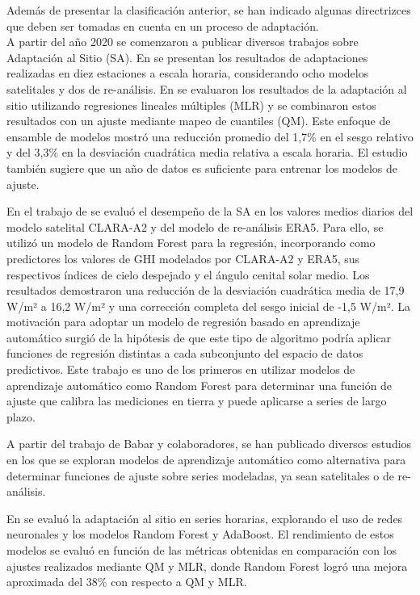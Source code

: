Además de presentar la clasificación anterior, se han indicado algunas directrizces que deben ser tomadas en cuenta en un proceso de adaptación. \\



A partir del año 2020 se comenzaron a publicar diversos trabajos sobre Adaptación al Sitio (SA). En \citep{POLO2020} se presentan los resultados de adaptaciones realizadas en diez estaciones a escala horaria, considerando ocho modelos satelitales y dos de re-análisis. En \citep{Fernández2020} se evaluaron los resultados de la adaptación al sitio utilizando regresiones lineales múltiples (MLR) y se combinaron estos resultados con un ajuste mediante mapeo de cuantiles (QM). Este enfoque de ensamble de modelos mostró una reducción promedio del 1,7\% en el sesgo relativo y del 3,3\% en la desviación cuadrática media relativa a escala horaria. El estudio también sugiere que un año de datos es suficiente para entrenar los modelos de ajuste.

En el trabajo de \citep{BABAR2020} se evaluó el desempeño de la SA en los valores medios diarios del modelo satelital CLARA-A2 y del modelo de re-análisis ERA5. Para ello, se utilizó un modelo de Random Forest para la regresión, incorporando como predictores los valores de GHI modelados por CLARA-A2 y ERA5, sus respectivos índices de cielo despejado y el ángulo cenital solar medio. Los resultados demostraron una reducción de la desviación cuadrática media de 17,9 W/m² a 16,2 W/m² y una corrección completa del sesgo inicial de -1,5 W/m². La motivación para adoptar un modelo de regresión basado en aprendizaje automático surgió de la hipótesis de que este tipo de algoritmo podría aplicar funciones de regresión distintas a cada subconjunto del espacio de datos predictivos. Este trabajo es uno de los primeros en utilizar modelos de aprendizaje automático como Random Forest para determinar una función de ajuste que calibra las mediciones en tierra y puede aplicarse a series de largo plazo.

A partir del trabajo de Babar y colaboradores, se han publicado diversos estudios en los que se exploran modelos de aprendizaje automático como alternativa para determinar funciones de ajuste sobre series modeladas, ya sean satelitales o de re-análisis.

En \citep{NARVAEZ2021} se evaluó la adaptación al sitio en series horarias, explorando el uso de redes neuronales y los modelos Random Forest y AdaBoost. El rendimiento de estos modelos se evaluó en función de las métricas obtenidas en comparación con los ajustes realizados mediante QM y MLR, donde Random Forest logró una mejora aproximada del 38\% con respecto a QM y MLR.

